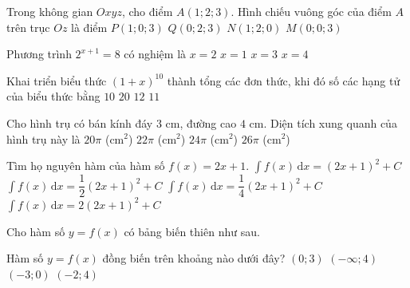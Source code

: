 \begin{ex}%
	Trong không gian $Oxyz$, cho điểm $A(1;2;3)$. Hình chiếu vuông góc của điểm $A$ trên trục $Oz$ là điểm
	\choice
	{$P(1;0;3)$}
	{$Q(0;2;3)$}
	{$N(1;2;0)$}
	{\True $M(0;0;3)$}
\end{ex}
\begin{ex}%
	Phương trình $2^{x+1}=8$ có nghiệm là
	\choice
	{\True $x=2$}
	{$x=1$}
	{$x=3$}
	{$x=4$}
\end{ex}
\begin{ex}%
	Khai triển biểu thức $(1+x)^{10}$ thành tổng các đơn thức, khi đó số các hạng tử của biểu thức bằng
	\choice
	{$10$}
	{$20$}
	{$12$}
	{\True $11$}
\end{ex}
\begin{ex}%
	Cho hình trụ có bán kính đáy $3$ cm, đường cao $4$ cm. Diện tích xung quanh của hình trụ này là
	\choice
	{$20\pi$ (cm$^2$)}
	{$22\pi$ (cm$^2$)}
	{\True $24\pi$ (cm$^2$)}
	{$26\pi$ (cm$^2$)}
\end{ex}
\begin{ex}%
	Tìm họ nguyên hàm của hàm số $f(x)=2x+1$.
	\choice
	{$\displaystyle\int f(x)\mathrm{\,d}x=(2x+1)^2+C$}
	{$\displaystyle\int f(x)\mathrm{\,d}x=\dfrac{1}{2}(2x+1)^2+C$}
	{\True $\displaystyle\int f(x)\mathrm{\,d}x=\dfrac{1}{4}(2x+1)^2+C$}
	{$\displaystyle\int f(x)\mathrm{\,d}x=2(2x+1)^2+C$}
\end{ex}
\begin{ex}%
	Cho hàm số $y=f(x)$ có bảng biến thiên như sau.
	\begin{center}
	\end{center}
	Hàm số $y=f(x)$ đồng biến trên khoảng nào dưới đây?
	\choice
	{\True $(0;3)$}
	{$(-\infty;4)$}
	{$(-3;0)$}
	{$(-2;4)$}
\end{ex}
